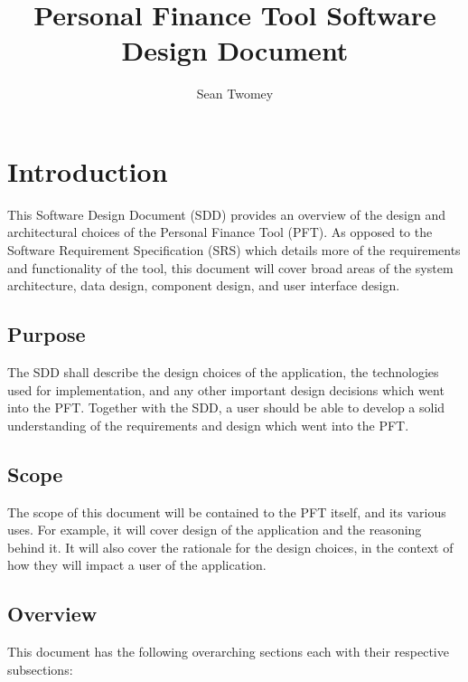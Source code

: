 \documentclass{article}
\title{Personal Finance Tool Software Design Document}
\author{Sean Twomey}
\begin{document}
\maketitle
\tableofcontents
\newpage

\section{Introduction}

This Software Design Document (SDD) provides an overview of the design and architectural choices of the Personal Finance Tool (PFT).
As opposed to the Software Requirement Specification (SRS) which details more of the requirements and functionality of the tool, this document will cover broad
areas of the system architecture, data design, component design, and user interface design. 

\subsection{Purpose}

The SDD shall describe the design choices of the application, the technologies used for implementation, and any other important design decisions which went into the PFT. Together with the SDD, a user should be able to develop a solid understanding
of the requirements and design which went into the PFT.

\subsection{Scope}

The scope of this document will be contained to the PFT itself, and its various uses. For example, it will cover design of the application and the reasoning behind it. It will also cover the rationale for the design choices, in the context of how they will impact a user of the application.

\subsection{Overview}

This document has the following overarching sections each with their respective subsections:
\end{document}
